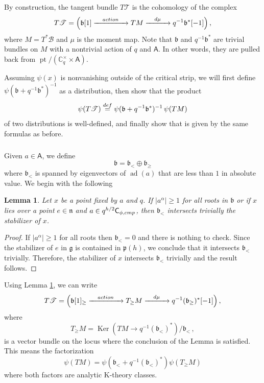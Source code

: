 \documentclass[14pt]{extarticle}
\newcommand{\Ct}{\mathbb{C}^\times}
\newcommand{\bA}{\mathsf{A}}
\newcommand{\bC}{\mathsf{C}}
\newcommand{\cT}{\mathscr{T}}
\newcommand{\cB}{\mathscr{B}}
\newcommand{\fg}{\mathfrak{g}}
\newcommand{\fp}{\mathfrak{p}}
\newcommand{\fn}{\mathfrak{n}}
\newcommand{\fb}{\mathfrak{b}}
\newcommand{\eqdef}{\overset{\tiny\textup{def}}=}
\newcommand{\comp}{\textup{cmp}}
\DeclareMathOperator{\Ker}{Ker}
\DeclareMathOperator{\pt}{pt}
\DeclareMathOperator{\ad}{ad}
\newtheorem{Lemma}{Lemma}[section]
\theoremstyle{definition}
\begin{document}
By construction, the tangent bundle $T\cT$ is the cohomology of the
complex
%
\begin{equation}
  \label{eq:179}
  T\cT = \Big(
\fb[1] \xrightarrow{\quad \textup{action} \quad}  TM \xrightarrow{\quad d\mu \quad}
q^{-1} \fb^* [-1] \Big)\,,
\end{equation}
%
where $M=T^*\cB$ and $\mu$ is the moment map.
Note that $\fb$ and $q^{-1} \fb^*$ are trivial bundles on $M$
with a nontrivial action of $q$ and $\bA$. In other words, they are
pulled back from $\pt/(\Ct_q \times \bA)$. 

Assuming $\psi(x)$ is nonvanishing outside of the critical strip, we
will first define $\psi(\fb+q^{-1} \fb^*)^{-1}$ as a distribution, 
then 
show that the product 
%
\begin{equation}
  \label{eq:180}
  \psi(T\cT) \eqdef \psi(\fb+q^{-1} \fb^*)^{-1}  \, \psi(TM) 
\end{equation}
%
of two distributions is well-defined, and finally show that is given by the same
formulas as before.

\subsubsection{}

Given $a\in \bA$, we define
\[
  \fb = \fb_{<} \oplus \fb_{\ge} 
\]
where $\fb_{<}$ is spanned by eigenvectors of $\ad(a)$ that are
less than $1$ in absolute value.  We begin with the following

\begin{Lemma}\label{lbm} Let $x$ be a point fixed by $a$ and $q$. If 
 $|a^\alpha| \ge  1$ for all roots in $\fb$ or if $x$ lies over a point $e \in \fn$
 and $a \in q^{h/2} \bC_{\phi,\comp}$, then $\fb_{<}$
  intersects trivially the stabilizer of $x$. 
\end{Lemma}

\begin{proof}
  If $|a^\alpha| \ge 1$ for all roots then $\fb_{<}=0$ and there is nothing to check. 
Since the stabilizer of $e$ in $\fg$ is contained in $\fp(h)$, we
conclude  that it intersects $\fb_{<}$ trivially. Therefore, the
stabilizer of $x$ intersects $\fb_{<}$ trivially and the result
follows. 
\end{proof}

\noindent 
Using Lemma
\ref{lbm}, we can write
%
\begin{equation}
  \label{eq:179-2}
  T\cT = \Big(
\fb[1]_{\ge}  \xrightarrow{\quad \textup{action} \quad}  T_{\ge} M \xrightarrow{\quad d\mu \quad}
q^{-1} (\fb_{\ge})^* [-1]\Big)\,,
\end{equation}
%
where
%
\[ 
T_{\ge} M = \Ker( T M \to 
q^{-1} (\fb_{<})^{*} ) / \fb_< \,,
\]
%
is a vector bundle on the locus where the conclusion of the Lemma
is satisfied. This means the factorization 
%
\begin{equation}
  \label{eq:179-3}
\psi(TM) = \psi(\fb_<+ q^{-1} (\fb_{<})^{*} ) \psi(T_{\ge} M) 
\end{equation}
%
where both factors are analytic K-theory classes. 
\end{document}
